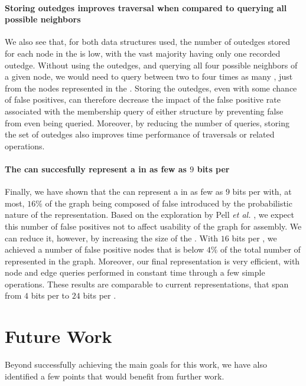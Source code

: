 \paragraph*{Storing outedges improves traversal when compared to querying all possible neighbors}

We also see that, for both data structures used, the number of outedges stored for each node in the \dBG is low, with the vast majority having only one recorded outedge. Without using the outedges, and querying all four possible neighbors of a given node, we would need to query between two to four times as many , just from the nodes represented in the \dBG. Storing the outedges, even with some chance of false positives, can therefore decrease the impact of the false positive rate associated with the membership query of either structure by preventing false  from even being queried. Moreover, by reducing the number of queries, storing the set of outedges also improves time performance of traversals or related operations.

\paragraph*{The \dBHT can succesfully represent a \dBG in as few as $9$ bits per \kmer}

Finally, we have shown that the \dBHT can represent a \dBG in as few as $9$ bits per \kmer with, at most, $16\%$ of the graph being composed of false  introduced by the probabilistic nature of the representation. Based on the exploration by Pell \emph{et al.} \cite{Pell2012}, we expect this number of false positives not to affect usability of the graph for assembly. We can reduce it, however, by increasing the size of the \dBHT. With $16$ bits per \kmer, we achieved a number of false positive nodes that is below $4\%$ of the total number of  represented in the graph. Moreover, our final \dBHT representation is very efficient, with node and edge queries performed in constant time through a few simple operations.
These results are comparable to current \dBG representations, that span from $4$ bits per \kmer to $24$ bits per \kmer \cite{Chikhi2013, Giani2020}.

\section{Future Work}

Beyond successfully achieving the main goals for this work, we have also identified a few points that would benefit from further work.

